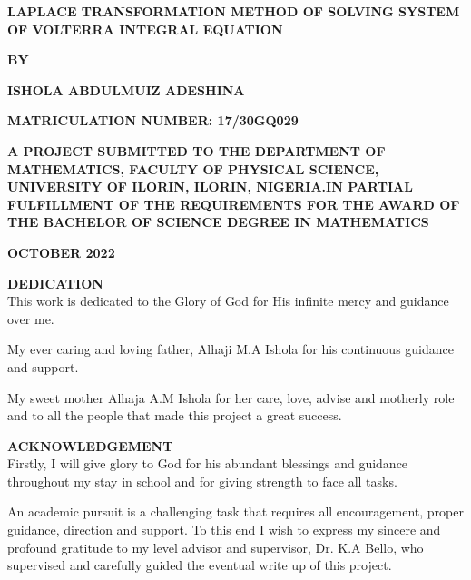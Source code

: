 \documentclass[12pt]{article}
\begin{document}
\begin{titlepage}
\begin{center}
\vspace*{1cm}


		\textbf{LAPLACE TRANSFORMATION METHOD OF SOLVING SYSTEM OF VOLTERRA INTEGRAL EQUATION}


\vspace{0.5cm}

\textbf{BY}

\vspace{1.5cm}

\textbf{ISHOLA ABDULMUIZ ADESHINA}

\textbf{MATRICULATION NUMBER: 17/30GQ029}

\vfill

\textbf{A PROJECT SUBMITTED TO THE DEPARTMENT OF MATHEMATICS, FACULTY OF PHYSICAL SCIENCE, UNIVERSITY OF ILORIN, ILORIN, NIGERIA.IN PARTIAL FULFILLMENT OF THE REQUIREMENTS FOR THE AWARD OF THE BACHELOR OF SCIENCE DEGREE IN MATHEMATICS}

\vspace{0.8cm}

\vfill

\textbf{OCTOBER 2022}

\end{center}
\end{titlepage}

\textbf{DEDICATION}\\

This work is dedicated to the Glory of God for His infinite mercy and guidance over me.

My ever caring and loving father, Alhaji M.A Ishola for his continuous guidance and support.

My sweet mother Alhaja A.M Ishola for her care, love, advise and motherly role and to all the people that made this project a great success.

\newpage
{}
\textbf{ACKNOWLEDGEMENT}\\

Firstly, I will give glory to God for his abundant blessings and guidance throughout my stay in school and for giving strength to face all tasks.

	An academic pursuit is a challenging task that requires all encouragement, proper guidance, direction and support. To this end I wish to express my sincere and profound gratitude to my level advisor and supervisor, Dr. K.A Bello, who supervised and carefully guided the eventual write up of this project.
\end{document}
